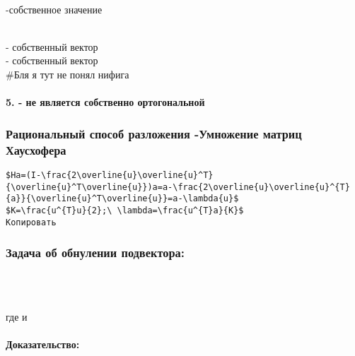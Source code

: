 \documentclass[
]{article}
\begin{document}
{}\strut \\
{}-собственное значение\\
{}\strut \\
{} - собственный вектор\\
{} - собственный вектор\\
\#Бля я тут не понял нифига

\paragraph{\texorpdfstring{5. {} - не является собственно
ортогональной}{5.  - не является собственно ортогональной}}\label{ux43dux435-ux44fux432ux43bux44fux435ux442ux441ux44f-ux441ux43eux431ux441ux442ux432ux435ux43dux43dux43e-ux43eux440ux442ux43eux433ux43eux43dux430ux43bux44cux43dux43eux439}

{}

\subsubsection{Рациональный способ разложения -Умножение матриц
Хаусхофера}\label{ux440ux430ux446ux438ux43eux43dux430ux43bux44cux43dux44bux439-ux441ux43fux43eux441ux43eux431-ux440ux430ux437ux43bux43eux436ux435ux43dux438ux44f--ux443ux43cux43dux43eux436ux435ux43dux438ux435-ux43cux430ux442ux440ux438ux446-ux445ux430ux443ux441ux445ux43eux444ux435ux440ux430}

\begin{verbatim}
$Ha=(I-\frac{2\overline{u}\overline{u}^T}{\overline{u}^T\overline{u}})a=a-\frac{2\overline{u}\overline{u}^{T}{a}}{\overline{u}^T\overline{u}}=a-\lambda{u}$
$K=\frac{u^{T}u}{2};\ \lambda=\frac{u^{T}a}{K}$
Копировать
\end{verbatim}

\subsubsection{Задача об обнулении
подвектора:}\label{ux437ux430ux434ux430ux447ux430-ux43eux431-ux43eux431ux43dux443ux43bux435ux43dux438ux438-ux43fux43eux434ux432ux435ux43aux442ux43eux440ux430}

{}\strut \\
{}\strut \\
где {} и {}

\paragraph{Доказательство:}\label{ux434ux43eux43aux430ux437ux430ux442ux435ux43bux44cux441ux442ux432ux43e}
\end{document}
